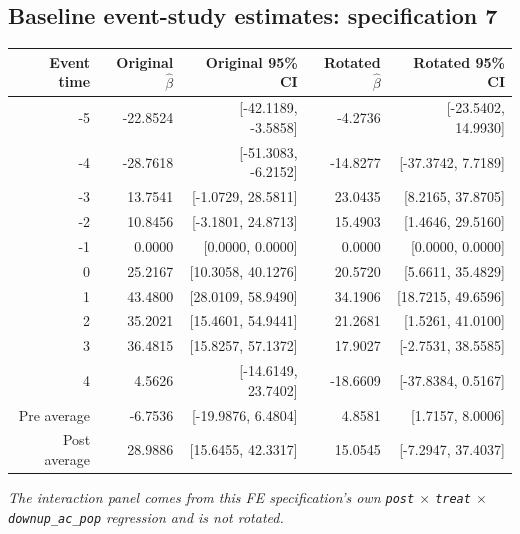 \documentclass[10pt]{article}
\begin{document}
\subsection*{Baseline event-study estimates: specification 7}
\begin{center}
\scriptsize
\begin{tabular}{r rr rr}
\toprule
Event time & Original $\hat\beta$ & Original 95\% CI & Rotated $\hat\beta$ & Rotated 95\% CI \\
\midrule
-5 & -22.8524 & [-42.1189, -3.5858] & -4.2736 & [-23.5402, 14.9930] \\
-4 & -28.7618 & [-51.3083, -6.2152] & -14.8277 & [-37.3742, 7.7189] \\
-3 & 13.7541 & [-1.0729, 28.5811] & 23.0435 & [8.2165, 37.8705] \\
-2 & 10.8456 & [-3.1801, 24.8713] & 15.4903 & [1.4646, 29.5160] \\
-1 & 0.0000 & [0.0000, 0.0000] & 0.0000 & [0.0000, 0.0000] \\
0 & 25.2167 & [10.3058, 40.1276] & 20.5720 & [5.6611, 35.4829] \\
1 & 43.4800 & [28.0109, 58.9490] & 34.1906 & [18.7215, 49.6596] \\
2 & 35.2021 & [15.4601, 54.9441] & 21.2681 & [1.5261, 41.0100] \\
3 & 36.4815 & [15.8257, 57.1372] & 17.9027 & [-2.7531, 38.5585] \\
4 & 4.5626 & [-14.6149, 23.7402] & -18.6609 & [-37.8384, 0.5167] \\
\midrule
Pre average & -6.7536 & [-19.9876, 6.4804] & 4.8581 & [1.7157, 8.0006] \\
Post average & 28.9886 & [15.6455, 42.3317] & 15.0545 & [-7.2947, 37.4037] \\
\bottomrule
\end{tabular}
\end{center}
\medskip
\textit{The interaction panel comes from this FE specification's own \texttt{post} $\times$ \texttt{treat} $\times$ \texttt{downup\_ac\_pop} regression and is not rotated.}
\clearpage
\end{document}

